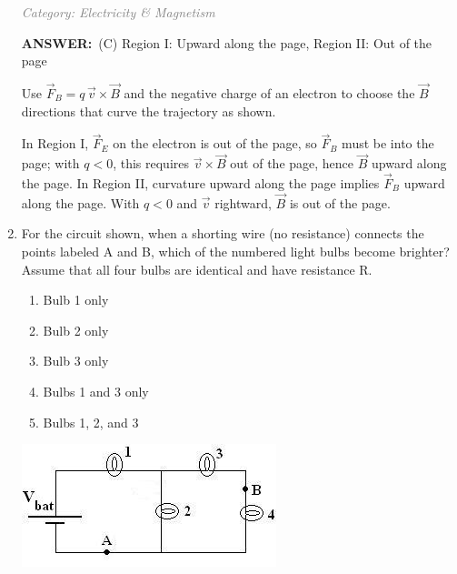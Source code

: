 \documentclass[12pt, a4paper]{article}
\makeatletter
\newcommand{\finalanswer}[1]{\textbf{ANSWER:}~#1}
\newif\if@categoryprinted
\newcommand{\category}[1]{\if@categoryprinted\relax\else\textit{\textcolor{gray}{Category: #1}}\global\@categoryprintedtrue\fi}
\makeatother
\begin{document}
\begin{CJK*}{UTF8}{gbsn}
\begin{enumerate}[itemsep=1.0em, topsep=0.6em]
\category{Electricity \& Magnetism}
\begin{answerbox}
\finalanswer{(C) Region I: Upward along the page, Region II: Out of the page}
\end{answerbox}
\begin{insightbox}
Use $\vec F_B=q\,\vec v\times\vec B$ and the negative charge of an electron to choose the $\vec B$ directions that curve the trajectory as shown.
\end{insightbox}
\begin{solutionbox}

In Region I, $\vec F_E$ on the electron is out of the page, so $\vec F_B$ must be into the page; with $q<0$, this requires $\vec v\times\vec B$ out of the page, hence $\vec B$ upward along the page. In Region II, curvature upward along the page implies $\vec F_B$ upward along the page. With $q<0$ and $\vec v$ rightward, $\vec B$ is out of the page.
\end{solutionbox}

\newpage

\item \label{prob:9}
\noindent\begin{minipage}[t]{0.6\linewidth}
\vspace{0pt}
For the circuit shown, when a shorting wire (no resistance) connects the points labeled A and B, which of the numbered light bulbs become brighter? Assume that all four bulbs are identical and have resistance R.
\begin{enumerate}[label=(\Alph*)]
    \item Bulb 1 only
    \item Bulb 2 only
    \item Bulb 3 only
    \item Bulbs 1 and 3 only
    \item Bulbs 1, 2, and 3
\end{enumerate}
\end{minipage}%
\hfill
\begin{minipage}[t]{0.33\linewidth}
\vspace{0pt}
\centering
\includegraphics[width=\linewidth]{Problem_09_Figure.png}
\end{minipage}


\end{enumerate}
\end{CJK*}
\end{document}
